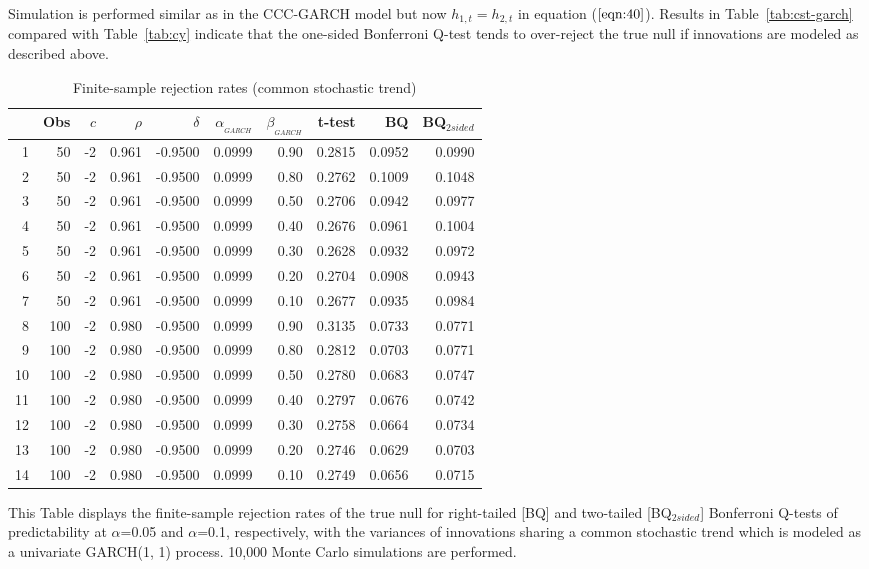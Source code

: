 \documentclass[11pt, a4paper]{article}
\begin{document}
Simulation is performed similar as in the CCC-GARCH model but now $h_{1, t} =h_{2, t}$ in equation ($\ref{eqn:40}$). Results in Table~\vref{tab:cst-garch} compared with Table~\vref{tab:cy}  indicate that the one-sided Bonferroni Q-test tends to over-reject the true null if innovations are modeled as described above.
\begin{table}[hbt]
\centering
\caption{Finite-sample rejection rates (common stochastic trend)}
\label{tab:cst-garch}
\begin{threeparttable}
\begin{tabular}{rrrrrrrrrr}
  \hline
  & Obs & $c$ & $\rho$ & $\delta$ & $\alpha_{_{GARCH}}$ & $\beta_{_{GARCH}}$ & t-test &BQ& BQ$_{{2sided}}$ \\ 
  \hline
1 & 50 & -2 & 0.961 & -0.9500 & 0.0999 & 0.90 & 0.2815 & 0.0952 & 0.0990 \\ 
  2 & 50 & -2 & 0.961 & -0.9500 & 0.0999 & 0.80 & 0.2762 & 0.1009 & 0.1048 \\ 
  3 & 50 & -2 & 0.961 & -0.9500 & 0.0999 & 0.50 & 0.2706 & 0.0942 & 0.0977 \\ 
  4 & 50 & -2 & 0.961 & -0.9500 & 0.0999 & 0.40 & 0.2676 & 0.0961 & 0.1004 \\ 
  5 & 50 & -2 & 0.961 & -0.9500 & 0.0999 & 0.30 & 0.2628 & 0.0932 & 0.0972 \\ 
  6 & 50 & -2 & 0.961 & -0.9500 & 0.0999 & 0.20 & 0.2704 & 0.0908 & 0.0943 \\ 
  7 & 50 & -2 & 0.961 & -0.9500 & 0.0999 & 0.10 & 0.2677 & 0.0935 & 0.0984 \\ 
  8 & 100 & -2 & 0.980 & -0.9500 & 0.0999 & 0.90 & 0.3135 & 0.0733 & 0.0771 \\ 
  9 & 100 & -2 & 0.980 & -0.9500 & 0.0999 & 0.80 & 0.2812 & 0.0703 & 0.0771 \\ 
  10 & 100 & -2 & 0.980 & -0.9500 & 0.0999 & 0.50 & 0.2780 & 0.0683 & 0.0747 \\ 
  11 & 100 & -2 & 0.980 & -0.9500 & 0.0999 & 0.40 & 0.2797 & 0.0676 & 0.0742 \\ 
  12 & 100 & -2 & 0.980 & -0.9500 & 0.0999 & 0.30 & 0.2758 & 0.0664 & 0.0734 \\ 
  13 & 100 & -2 & 0.980 & -0.9500 & 0.0999 & 0.20 & 0.2746 & 0.0629 & 0.0703 \\ 
  14 & 100 & -2 & 0.980 & -0.9500 & 0.0999 & 0.10 & 0.2749 & 0.0656 & 0.0715 \\ 
   \hline
\end{tabular}
 \begin{tablenotes}
 \small
\item This Table displays the finite-sample rejection rates of the true null for right-tailed [BQ] and two-tailed  [BQ$_{{2sided}}$] Bonferroni Q-tests of predictability at $\alpha$=0.05 and $\alpha$=0.1, respectively, with the variances of innovations sharing a common stochastic trend which is modeled as a univariate GARCH(1, 1) process. 10,000 Monte Carlo simulations are performed.
\end{tablenotes}
\end{threeparttable}
\end{table}
\end{document}
